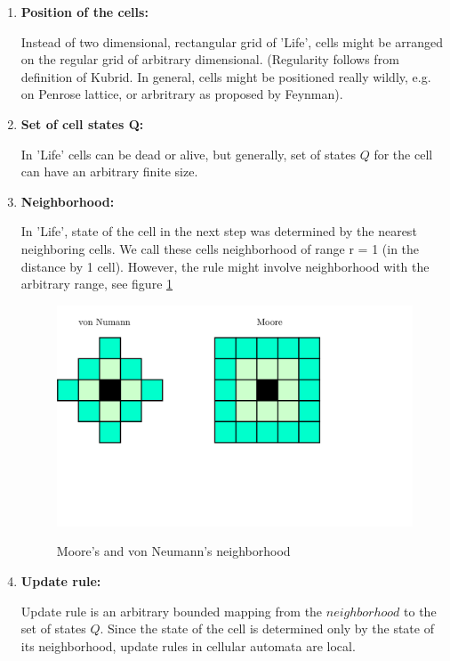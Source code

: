 \begin{enumerate}
\item \textbf{Position of the cells:}

Instead of two dimensional, rectangular grid of 'Life',
cells might be arranged on the regular grid of arbitrary dimensional. 
(Regularity follows from definition of Kubrid. In general, cells might be positioned really wildly,
e.g. on Penrose lattice, or arbritrary as proposed by Feynman).

\item \textbf{Set of cell states Q:}

In 'Life' cells can be dead or alive, but generally, set of states $Q$ for the cell can have an arbitrary finite size.
\bigskip

\item \textbf{Neighborhood:}

In 'Life', state of the cell in the next step was determined
by the nearest neighboring cells. We call these cells neighborhood of range r = 1 (in the distance by 1 cell).
However, the rule might involve neighborhood with the arbitrary range, see figure \ref{neighbor}

\begin{figure}
 \centering
 \includegraphics[width=1\textwidth]{./img/neighb}
 \label{neighbor}
 \caption{Moore's and von Neumann's neighborhood}
\end{figure}


\item \textbf{Update rule:}

Update rule is an arbitrary bounded mapping from the $neighborhood$ to the set of states $Q$.
Since the state of the cell is determined only by the state of its neighborhood, update rules in cellular automata are local.


\end{enumerate}
